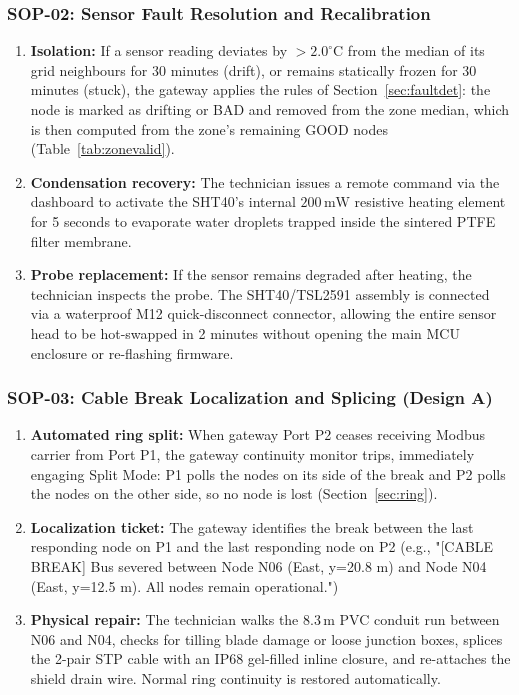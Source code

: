 \documentclass[11pt,a4paper]{report}
\begin{document}
\subsubsection{SOP-02: Sensor Fault Resolution and Recalibration}
\begin{enumerate}[noitemsep]
  \item \textbf{Isolation:} If a sensor reading deviates by $> 2.0^\circ\text{C}$ from the median of its grid neighbours for 30 minutes (drift), or remains statically frozen for 30 minutes (stuck), the gateway applies the rules of Section~\ref{sec:faultdet}: the node is marked as drifting or BAD and removed from the zone median, which is then computed from the zone's remaining GOOD nodes (Table~\ref{tab:zonevalid}).
  \item \textbf{Condensation recovery:} The technician issues a remote command via the dashboard to activate the SHT40's internal $200\,\text{mW}$ resistive heating element for 5 seconds to evaporate water droplets trapped inside the sintered PTFE filter membrane.
  \item \textbf{Probe replacement:} If the sensor remains degraded after heating, the technician inspects the probe. The SHT40/TSL2591 assembly is connected via a waterproof M12 quick-disconnect connector, allowing the entire sensor head to be hot-swapped in 2 minutes without opening the main MCU enclosure or re-flashing firmware.
\end{enumerate}

\subsubsection{SOP-03: Cable Break Localization and Splicing (Design A)}
\begin{enumerate}[noitemsep]
  \item \textbf{Automated ring split:} When gateway Port P2 ceases receiving Modbus carrier from Port P1, the gateway continuity monitor trips, immediately engaging Split Mode: P1 polls the nodes on its side of the break and P2 polls the nodes on the other side, so no node is lost (Section~\ref{sec:ring}).
  \item \textbf{Localization ticket:} The gateway identifies the break between the last responding node on P1 and the last responding node on P2 (e.g., \textsf{"[CABLE BREAK] Bus severed between Node N06 (East, y=20.8 m) and Node N04 (East, y=12.5 m). All nodes remain operational."})
  \item \textbf{Physical repair:} The technician walks the 8.3\,m PVC conduit run between N06 and N04, checks for tilling blade damage or loose junction boxes, splices the 2-pair STP cable with an IP68 gel-filled inline closure, and re-attaches the shield drain wire. Normal ring continuity is restored automatically.
\end{enumerate}
\end{document}

